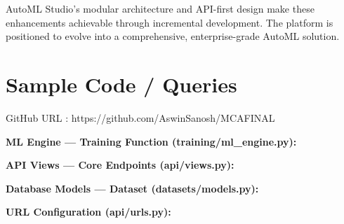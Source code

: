 \documentclass[12pt,a4paper]{report}
\begin{document}
AutoML Studio's modular architecture and API-first design make these enhancements achievable through incremental development. The platform is positioned to evolve into a comprehensive, enterprise-grade AutoML solution.



\clearpage

\setcounter{chapter}{8}
\setcounter{section}{0}
\clearpage
\thispagestyle{empty}

\noindent
{}

\clearpage
{}

\pagestyle{maincontent}


\section{Sample Code / Queries}

GitHub URL : https://github.com/AswinSanosh/MCAFINAL

\vspace{0.5cm}

\textbf{ML Engine — Training Function (training/ml\_engine.py):}


\vspace{0.5cm}

\textbf{API Views — Core Endpoints (api/views.py):}


\vspace{0.5cm}

\textbf{Database Models — Dataset (datasets/models.py):}


\vspace{0.5cm}

\textbf{URL Configuration (api/urls.py):}

\end{document}
